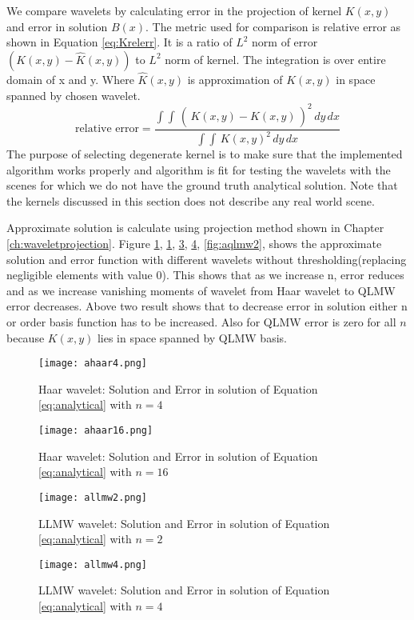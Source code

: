We compare wavelets by calculating error in the projection of kernel $K(x,y)$ and error in solution $B(x)$. The metric used for comparison is relative error as shown in Equation \ref{eq:Krelerr}. It is a ratio of $L^2$ norm of error $(K(x,y)-\hat{K}(x,y))$ to $L^2$ norm of kernel. The integration is over entire domain of x and y. Where $\hat{K}(x,y)$ is approximation of $K(x,y)$ in space spanned by chosen wavelet.
\begin{equation} \label{eq:Krelerr}
\text{relative  error}=\frac{\int\int \,(\,K(x,y)-\hat{K}(x,y)\,)^2  \,dy \, dx}{\int\int \,K(x,y)^2  \,dy \, dx}
\end{equation}
The purpose of selecting degenerate kernel is to make sure that the implemented algorithm works properly and algorithm is fit for testing the wavelets with the scenes for which we do not have the ground truth analytical solution. Note that the kernels discussed in this section does not describe any real world scene. 

Approximate solution is calculate using projection method shown in Chapter \ref{ch:waveletprojection}. Figure \ref{fig:ahaar4}, \ref{fig:ahaar4}, \ref{fig:allmw2}, \ref{fig:allmw4}, \ref{fig:aqlmw2}, shows the approximate solution and error function with different wavelets without thresholding(replacing negligible elements  with value 0). This shows that as we increase n, error reduces and as we increase vanishing moments of wavelet from Haar wavelet to QLMW error decreases. Above two result shows that to decrease error in  solution either n or order basis function has to be increased. Also for QLMW error is zero for all $n$ because $K(x,y)$ lies in space spanned by QLMW basis.



\begin{figure}[h!]
\centering{}
\captionsetup{justification=centering}
\texttt{[image: ahaar4.png]}
\caption{\label{fig:ahaar4}Haar wavelet: Solution and Error in solution of Equation \ref{eq:analytical} with $n=4$}
\end{figure}

\begin{figure}[h!]
\centering{}
\captionsetup{justification=centering}
\texttt{[image: ahaar16.png]}
\caption{\label{fig:ahaar16}Haar wavelet: Solution and Error in solution of Equation \ref{eq:analytical} with $n=16$}
\end{figure}
\begin{figure}[h!]
\centering{}
\captionsetup{justification=centering}
\texttt{[image: allmw2.png]}
\caption{\label{fig:allmw2}LLMW wavelet: Solution and Error in solution of Equation \ref{eq:analytical} with $n=2$}
\end{figure}
\begin{figure}[h!]
\centering{}
\captionsetup{justification=centering}
\texttt{[image: allmw4.png]}
\caption{\label{fig:allmw4}LLMW wavelet: Solution and Error in solution of Equation \ref{eq:analytical} with $n=4$}
\end{figure}



